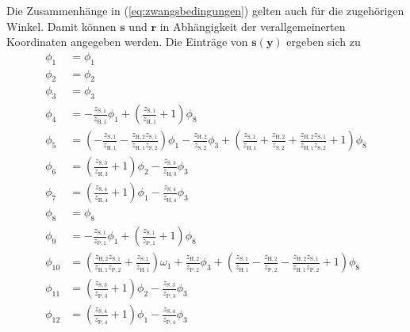 Die Zusammenhänge in (\ref{eq:zwangsbedingungen}) gelten auch für die zugehörigen Winkel. Damit können $\pmb{s}$ und $\pmb{r}$ in Abhängigkeit der verallgemeinerten Koordinaten angegeben werden. Die Einträge von $\pmb{s}(\pmb{y})$ ergeben sich zu 
\begin{subequations}\label{eq:zwangsbedingungen_aufgelöst}
	\begin{align}
	 	\phi_1 &= \phi_1 \\
	 	\phi_2 &= \phi_2 \\
	 	\phi_3 &= \phi_3 \\ \label{eq:s4}
		\phi_{4} &= -\frac{z_{\mathrm{S,1}} }{z_{\mathrm{H,1}} } \phi_1 +\left(\frac{z_{\mathrm{S,1}} }{z_{\mathrm{H,1}} }+1\right) \phi_8 \\
		\phi_{5} &= \left(-\frac{z_\mathrm{S,1} }{z_\mathrm{H,1} }-\frac{z_\mathrm{H,2} z_\mathrm{S,1}}{z_\mathrm{H,1} z_\mathrm{S,2}} \right) \phi_1
			-\frac{z_\mathrm{H,2} }{z_\mathrm{S,2}} \phi_3
			+\left(\frac{z_{\mathrm{S,1}} }{z_{\mathrm{H,1}} }+\frac{z_{\mathrm{H,2}} }{z_{\mathrm{S,2}} }+\frac{z_{\mathrm{H,2}} z_{\mathrm{S,1}}}{z_{\mathrm{H,1}} z_{\mathrm{S,2}}} +1\right) \phi_8 \\
		\phi_{6} &= \left(\frac{z_{\mathrm{S,3}} }{z_{\mathrm{H,3}} }+1\right) \phi_2 - \frac{z_{\mathrm{S,3}} }{z_{\mathrm{H,3}} } \phi_3 \\
		\phi_{7} &= \left(\frac{z_{\mathrm{S,4}} }{z_{\mathrm{H,4}} }+1\right) \phi_1 - \frac{z_{\mathrm{S,4}} }{z_{\mathrm{H,4}} } \phi_3 \\
		\phi_8 &= \phi_8 \\
		\phi_{9} &= -\frac{z_{\mathrm{S,1}} }{z_\mathrm{P,1} } \phi_1 +\left(\frac{z_\mathrm{S,1} }{z_\mathrm{P,1}} +1\right) \phi_8 \\
		\phi_{10} &= \left(\frac{z_\mathrm{H,2} z_\mathrm{S,1}}{z_\mathrm{H,1} z_\mathrm{P,2}} + \frac{z_\mathrm{S,1}}{z_\mathrm{H,1}} \right) \omega_1
			+\frac{z_\mathrm{H,2}}{z_\mathrm{P,2}} \phi_3
			+\left(\frac{z_\mathrm{S,1}}{z_\mathrm{H,1}} -\frac{z_\mathrm{H,2} }{z_\mathrm{P,2} }-\frac{z_\mathrm{H,2}  z_\mathrm{S,1}}{z_\mathrm{H,1}  z_\mathrm{P,2}} + 1\right) \phi_8 \\
		\phi_{11} &= \left( \frac{z_{\mathrm{S,3}}}{z_{\mathrm{P,3}}} + 1 \right) \phi_2 -\frac{z_{\mathrm{S,3}}}{z_{\mathrm{P,3}}} \phi_3 \\
		\phi_{12} &= \left( \frac{z_{\mathrm{S,4}}}{z_{\mathrm{P,4}}} + 1 \right) \phi_1 -\frac{z_{\mathrm{S,4}}}{z_{\mathrm{P,4}}} \phi_3
	\end{align}
\end{subequations}
